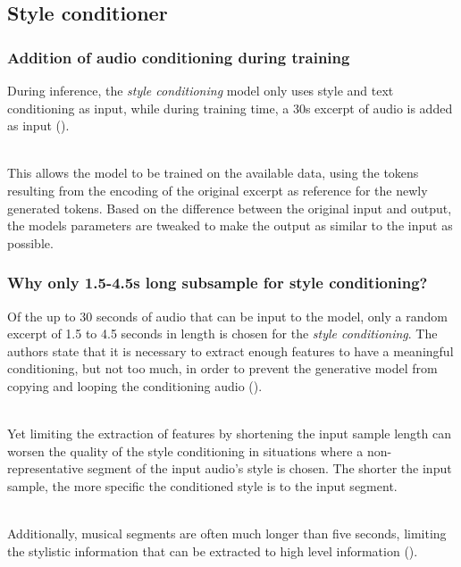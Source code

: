 \documentclass[a4paper,12pt,twoside]{article}
\begin{document}
\subsection{Style conditioner}

\subsubsection{Addition of audio conditioning during training}

During inference, the \textit{style conditioning} model only uses style and text conditioning as input, while during training time, a 30s excerpt of audio is added as input (\cite{rouardAudioConditioningMusic2024}). \\ \

This allows the model to be trained on the available data, using the tokens resulting from the encoding of the original excerpt as reference for the newly generated tokens. Based on the difference between the original input and output, the models parameters are tweaked to make the output as similar to the input as possible.

\subsubsection{Why only 1.5-4.5s long subsample for style conditioning?} \label{sec:subsampleLength}

Of the up to 30 seconds of audio that can be input to the model, only a random excerpt of 1.5 to 4.5 seconds in length is chosen for the \textit{style conditioning}. The authors state that it is necessary to extract enough features to have a meaningful conditioning, but not too much, in order to prevent the generative model from copying and looping the conditioning audio (\cite{rouardAudioConditioningMusic2024}).\\ \

Yet limiting the extraction of features by shortening the input sample length can worsen the quality of the style conditioning in situations where a non-representative segment of the input audio's style is chosen. The shorter the input sample, the more specific the conditioned style is to the input segment.\\ \

Additionally, musical segments are often much longer than five seconds, limiting the stylistic information that can be extracted to high level information (\cite{rouardAudioConditioningMusic2024}). \\ \
\end{document}
